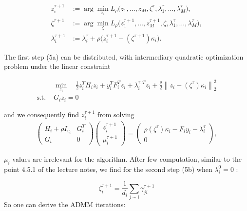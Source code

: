 \documentclass[10pt,english]{article}
\begin{document}
\begin{subequations}
\begin{align}
z_i^{\tau+1}
&:= \arg\min_{z_i}
L_\rho\big(z_1,\ldots,z_M,\zeta^\tau,\lambda_1^\tau,\ldots,\lambda_M^\tau\big), \tag{5a} \\[0.5em]
\zeta^{\tau+1}
&:= \arg\min_{\zeta}
L_\rho\big(z_1^{\tau+1},\ldots,z_M^{\tau+1},\zeta,\lambda_1^\tau,\ldots,\lambda_M^\tau\big), \tag{5b} \\[0.5em]
\lambda_i^{\tau+1}
&:= \lambda_i^\tau + \rho \big( z_i^{\tau+1} - (\zeta^{\tau+1})\kappa_i \big). \tag{5c}
\end{align}
\end{subequations}

The first step (5a) can be distributed, with intermediary quadratic optimization problem under the linear constraint 

\begin{equation*}
    \begin{aligned}
& \min_{z_i} \quad 
\frac{1}{2} z_i^T H_i z_i 
+ y_i^T F_i^T z_i 
+ \lambda_i^{\tau,T} z_i 
+ \frac{\rho}{2} \left\| z_i - (\zeta^\tau)\kappa_i \right\|_2^2 \\
\text{s.t. }& G_i z_i = 0
\end{aligned}
\end{equation*}


and we consequently find $z_i^{\tau+1}$ from solving
\begin{equation}\label{explicit first ADMM step}
\begin{aligned}
\begin{pmatrix}
H_i + \rho I_{v_i} & G_i^T \\
G_i & 0
\end{pmatrix}
\begin{pmatrix}
z_i^{\tau+1} \\
\mu_i^{\tau+1}
\end{pmatrix}
=
\begin{pmatrix}
\rho (\zeta^\tau)\kappa_i - F_i y_i - \lambda_i^\tau \\
0   
\end{pmatrix},
\end{aligned}
\end{equation}

$\mu_i$ values are irrelevant for the algorithm.
After few computation, similar to the point 4.5.1 of the lecture notes, we find for the second step (5b) when $\lambda_i^0=0$ :

\begin{equation}\label{second step ADMM}
    \zeta_i^{\tau+1} = \frac{1}{d_i} \sum_{j \sim i} \gamma_{ji}^{\tau+1}
\end{equation}    
So one can derive the ADMM iterations: \label{ADMM explicit}
\end{document}
